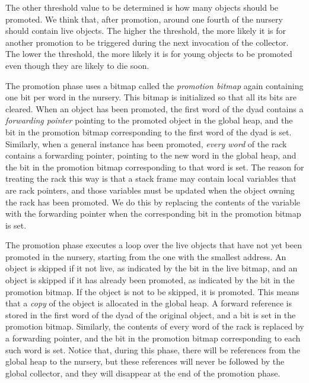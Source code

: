 The other threshold value to be determined is how many objects should
be promoted.  We think that, after promotion, around one fourth of the
nursery should contain live objects.  The higher the threshold, the
more likely it is for another promotion to be triggered during the
next invocation of the collector.  The lower the threshold, the more
likely it is for young objects to be promoted even though they are
likely to die soon.

The promotion phase uses a bitmap called the \emph{promotion bitmap}
again containing one bit per word in the nursery.  This bitmap is
initialized so that all its bits are cleared.  When an object has been
promoted, the first word of the dyad contains a \emph{forwarding
  pointer} pointing to the promoted object in the global heap, and the
bit in the promotion bitmap corresponding to the first word of the
dyad is set.  Similarly, when a general instance has been promoted,
\emph{every word} of the rack contains a forwarding pointer, pointing
to the new word in the global heap, and the bit in the promotion
bitmap corresponding to that word is set.  The reason for treating the
rack this way is that a stack frame may contain local variables that
are rack pointers, and those variables must be updated when the object
owning the rack has been promoted.  We do this by replacing the
contents of the variable with the forwarding pointer when the
corresponding bit in the promotion bitmap is set.

The promotion phase executes a loop over the live objects that have
not yet been promoted in the nursery, starting from the one with the
smallest address.  An object is skipped if it not live, as indicated
by the bit in the live bitmap, and an object is skipped if it has
already been promoted, as indicated by the bit in the promotion
bitmap.  If the object is not to be skipped, it is promoted.  This
means that a \emph{copy} of the object is allocated in the global
heap.  A forward reference is stored in the first word of the dyad
of the original object, and a bit is set in the promotion bitmap.
Similarly, the contents of every word of the rack is replaced by a
forwarding pointer, and the bit in the promotion bitmap corresponding
to each such word is set.  Notice that, during this phase, there will
be references from the global heap to the nursery, but these
references will never be followed by the global collector, and they
will disappear at the end of the promotion phase.

